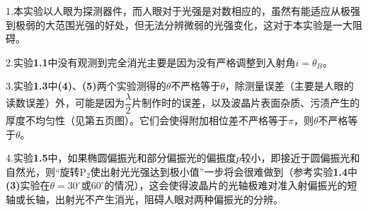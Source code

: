\documentclass[a4paper,fontset=windows]{ctexart}
\begin{document}
{1.本实验以人眼为探测器件，而人眼对于光强是对数相应的，虽然有能适应从极强到极弱的大范围光强的好处，但无法分辨微弱的光强变化，这对于本实验是一大阻碍。

2.实验\textbf{1.1}中没有观测到完全消光主要是因为没有严格调整到入射角$i = \theta_B$。

3.实验\textbf{1.3}中\textbf{(4)}、\textbf{(5)}两个实验测得的$\theta$不严格等于$\theta$，除测量误差（主要是人眼的读数误差）外，可能是因为$\dfrac{\lambda}{2}$片制作时的误差，以及波晶片表面杂质、污渍产生的厚度不均匀性（见第五页图）。它们会使得附加相位差不严格等于$\pi$，则$\theta$不严格等于$\theta$。

4.实验\textbf{1.5}中，如果椭圆偏振光和部分偏振光的偏振度$p$较小，即接近于圆偏振光和自然光，则“旋转$\mathrm{P_2}$使出射光光强达到极小值”一步将会很难做到（参考实验\textbf{1.4}中\textbf{(3)}实验在$\theta=30^\circ$或$60^\circ$的情况），这会使得波晶片的光轴极难对准入射偏振光的短轴或长轴，出射光不产生消光，阻碍人眼对两种偏振光的分辨。

}
\end{document}
